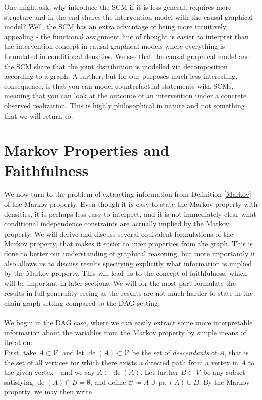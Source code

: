 \documentclass[11pt, a4paper]{memoir}
\theoremstyle{break}
\theoremstyle{break}
\theoremstyle{nonumberplain}
\DeclareMathOperator{\pa}{pa}
\DeclareMathOperator{\de}{de}
\begin{document}
One might ask, why introduce the SCM if it is less general, requires more structure and in the end shares the intervention model with the causal graphical model? Well, the SCM has an extra advantage of being more intuitively appealing - the functional assignment line of thought is easier to interpret than the intervention concept in causal graphical models where everything is formulated in conditional densities. We see that the causal graphical model and the SCM share that the joint distribution is modelled via decomposition according to a graph. A further, but for our purposes much less interesting, consequence, is that you can model counterfactual statements with SCMs, meaning that you can look at the outcome of an intervention under a concrete observed realization. This is highly philosophical in nature and not something that we will return to.
\section{Markov Properties and Faithfulness}
We now turn to the problem of extracting information from Definition \ref{Markov} of the Markov property. Even though it is easy to state the Markov property with densities, it is perhaps less easy to interpret, and it is not immediately clear what conditional independence constraints are actually implied by the Markov property. We will derive and discuss several equivalent formulations of the Markov property, that makes it easier to infer properties from the graph. This is done to better our understanding of graphical reasoning, but more importantly it also allows us to discuss results specifying explicitly what information is implied by the Markov property. This will lead us to the concept of faithfulness, which will be important in later sections. We will for the most part formulate the results in full generality seeing as the results are not much harder to state in the chain graph setting compared to the DAG setting.\\\\
We begin in the DAG case, where we can easily extract some more interpretable information about the variables from the Markov property by simple means of iteration:\\[5pt]
First, take $A\subset \mathcal{V}$, and let $\de(A)\subset \mathcal{V}$ be the set of \emph{descendants} of $A$, that is the set of all vertices for which there exists a directed path from a vertex in $A$ to the given vertex - and we say $A\subset \de(A)$. Let further $B\subset \mathcal{V}$ be any subset satisfying $\de(A)\cap B=\emptyset$, and define $\mathcal{C}\coloneqq A\cup\pa(A)\cup B$. By the Markov property, we may then write
\end{document}
